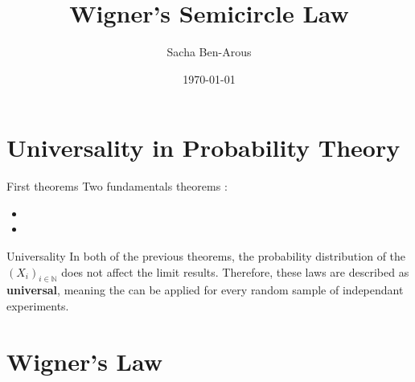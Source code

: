 \documentclass[10pt a4paper]{beamer}
\title{Wigner's Semicircle Law}
\date{\today}
\author{Sacha Ben-Arous}
\institute{ENS Paris-Saclay}
\begin{document}
  \maketitle
  
\begin{frame}
\tableofcontents
\end{frame}  

\section{Universality in Probability Theory}

\begin{frame}{First theorems}
    Two fundamentals theorems :
\begin{itemize}
\item <1> 
\item <2> 
\end{itemize}
\end{frame}

\begin{frame}{Universality}
In both of the previous theorems, the probability distribution of the $(X_i)_{i \in \mathbb{N}}$ does not affect the limit results. Therefore, these laws are described as \textbf{universal}, meaning the can be applied for every random sample of independant experiments.
\end{frame}

\section{Wigner's Law}
\end{document}
